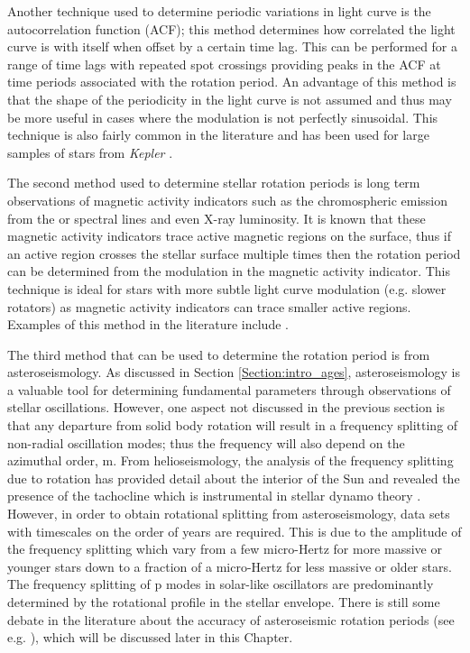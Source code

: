 Another technique used to determine periodic variations in light curve is the autocorrelation function (ACF); this method determines how correlated the light curve is with itself when offset by a certain time lag. This can be performed for a range of time lags with repeated spot crossings providing peaks in the ACF at time periods associated with the rotation period. An advantage of this method is that the shape of the periodicity in the light curve is not assumed and thus may be more useful in cases where the modulation is not perfectly sinusoidal. This technique is also fairly common in the literature and has been used for large samples of stars from \textit{Kepler} \citep{McQuillan_etal_2014}.

The second method used to determine stellar rotation periods is long term observations of magnetic activity indicators such as the chromospheric emission from the \caII or \Halpha spectral lines and even X-ray luminosity. It is known that these magnetic activity indicators trace active magnetic regions on the surface, thus if an active region crosses the stellar surface multiple times then the rotation period can be determined from the modulation in the magnetic activity indicator. This technique is ideal for stars with more subtle light curve modulation (e.g. slower rotators) as magnetic activity indicators can trace smaller active regions. Examples of this method in the literature include \citet{Boro_Saikia_etal_2016,Robertson_etal_2015_GJ176,DeWarf_etal_2010}.

The third method that can be used to determine the rotation period is from asteroseismology. As discussed in Section \ref{Section:intro_ages}, asteroseismology is a valuable tool for determining fundamental parameters through observations of stellar oscillations. However, one aspect not discussed in the previous section is that any departure from solid body rotation will result in a frequency splitting of non-radial oscillation modes; thus the frequency will also depend on the azimuthal order, m. From helioseismology, the analysis of the frequency splitting due to rotation has provided detail about the interior of the Sun and revealed the presence of the tachocline \citep{Spiegel_Zahn_1992} which is instrumental in stellar dynamo theory . However, in order to obtain rotational splitting from asteroseismology, data sets with timescales on the order of years are required. This is due to the amplitude of the frequency splitting which vary from a few micro-Hertz for more massive or younger stars down to a fraction of a micro-Hertz for less massive or older stars. The frequency splitting of p modes in solar-like oscillators are predominantly determined by the rotational profile in the stellar envelope. There is still some debate in the literature about the accuracy of asteroseismic rotation periods (see e.g. \citealt{Barnes_etal_2016_aspect_gyro}), which will be discussed later in this Chapter.

